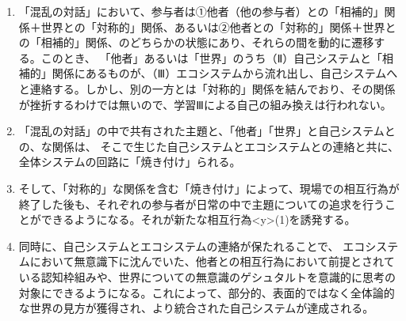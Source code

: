 \documentclass[b5j,twoside,twocolumn]{utarticle}
\begin{document}
\begin{enumerate}
\renewcommand{\labelenumi}{\pbox<y>{(\arabic{enumi})}}
\item 「混乱の対話」において、参与者は①他者（他の参与者）との「相補的」関係＋世界との「対称的」関係、あるいは②他者との「対称的」関係＋世界との「相補的」関係、のどちらかの状態にあり、それらの間を動的に遷移する。このとき、
「他者」あるいは「世界」のうち（Ⅱ）自己システムと「相補的」関係にあるものが、（Ⅲ）エコシステムから流れ出し、自己システムへと連絡する。しかし、別の一方とは「対称的」関係を結んでおり、その関係が挫折するわけでは無いので、学習Ⅲによる自己の組み換えは行われない。
\item 「混乱の対話」の中で共有された主題と、「他者」「世界」と自己システムとの、な関係は、
そこで生じた自己システムとエコシステムとの連絡と共に、全体システムの回路に「焼き付け」られる。
\item そして、「対称的」な関係を含む「焼き付け」によって、現場での相互行為が終了した後も、それぞれの参与者が日常の中で主題についての追求を行うことができるようになる。それが新たな相互行為\pbox<y>{(1)}を誘発する。
\item 同時に、自己システムとエコシステムの連絡が保たれることで、
エコシステムにおいて無意識下に沈んでいた、他者との相互行為において前提とされている認知枠組みや、世界についての無意識のゲシュタルトを意識的に思考の対象にできるようになる。これによって、部分的、表面的ではなく全体論的な世界の見方が獲得され、より統合された自己システムが達成される。
\end{enumerate}








\end{document}
